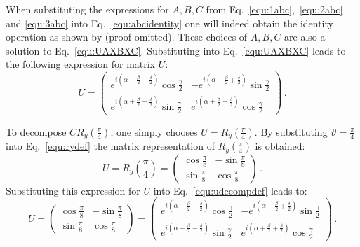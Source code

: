 When substituting the expressions for $A,B,C$ from Eq.~\ref{equ:1abc},~\ref{equ:2abc} and \ref{equ:3abc} into Eq.~\ref{equ:abcidentity} one will indeed obtain the identity operation as shown by (proof omitted). These choices of $A,B,C$ are also a solution to Eq.~\ref{equ:UAXBXC}. Substituting into Eq.~\ref{equ:UAXBXC} leads to the following expression for matrix $U$:
\begin{equation}
\label{equ:udecompdef}
U = \begin{pmatrix}
 e^{i(\alpha-\frac{\beta}{2}-\frac{\delta}{2})}\cos{\frac{\gamma}{2}} & -e^{i(\alpha-\frac{\beta}{2}+\frac{\delta}{2})}\sin{\frac{\gamma}{2}} \\ 
e^{i(\alpha+\frac{\beta}{2}-\frac{\delta}{2})}\sin{\frac{\gamma}{2}} & e^{i(\alpha+\frac{\beta}{2}+\frac{\delta}{2})}\cos{\frac{\gamma}{2}}
 \end{pmatrix}\, .
\end{equation}

To decompose $CR_y(\frac{\pi}{4})$, one simply chooses $U = R_y(\frac{\pi}{4})$. By substituting $\vartheta = \frac{\pi}{4}$ into Eq.~\ref{equ:rydef} the matrix representation of $R_y(\frac{\pi}{4})$ is obtained:
\begin{equation}
U = R_y(\frac{\pi}{4}) = \begin{pmatrix}
\cos\frac{\pi}{8} & -\sin\frac{\pi}{8} \\
\sin\frac{\pi}{8} & \cos\frac{\pi}{8}
\end{pmatrix}\, .
\end{equation}
Substituting this expression for $U$ into Eq.~\ref{equ:udecompdef} leads to:
\begin{equation}
\label{equ:udecompsubbed}
U = \begin{pmatrix}
\cos\frac{\pi}{8} & -\sin\frac{\pi}{8} \\
\sin\frac{\pi}{8} & \cos\frac{\pi}{8}
\end{pmatrix} = \begin{pmatrix}
 e^{i(\alpha-\frac{\beta}{2}-\frac{\delta}{2})}\cos{\frac{\gamma}{2}} & -e^{i(\alpha-\frac{\beta}{2}+\frac{\delta}{2})}\sin{\frac{\gamma}{2}} \\ 
e^{i(\alpha+\frac{\beta}{2}-\frac{\delta}{2})}\sin{\frac{\gamma}{2}} & e^{i(\alpha+\frac{\beta}{2}+\frac{\delta}{2})}\cos{\frac{\gamma}{2}}
 \end{pmatrix}\, .
\end{equation}

